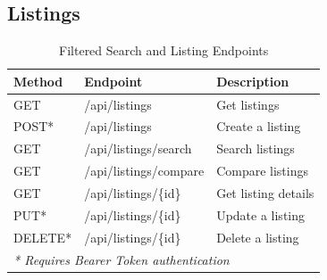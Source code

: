 \subsection{Listings}
\begin{table}[htpb]
\centering
\begin{tabular}{p{1.8cm} p{6.5cm} p{6.5cm}}
\toprule
\textbf{Method} & \textbf{Endpoint} & \textbf{Description} \\
\midrule
GET & /api/listings & Get listings \\
POST* & /api/listings & Create a listing \\
GET & /api/listings/search & Search listings \\
GET & /api/listings/compare & Compare listings \\
GET & /api/listings/\{id\} & Get listing details \\
PUT* & /api/listings/\{id\} & Update a listing \\
DELETE* & /api/listings/\{id\} & Delete a listing \\
\bottomrule
\multicolumn{3}{l}{\small \textit{* Requires Bearer Token authentication}}
\end{tabular}
\caption{Filtered Search and Listing Endpoints}
\label{tab:api_listings}
\end{table}
